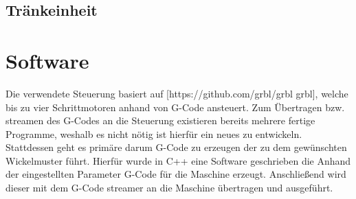 \documentclass[12pt, a4paper, ngerman]{article}
\begin{document}
\subsection{Tränkeinheit}



\section{Software}
Die verwendete Steuerung basiert auf [https://github.com/grbl/grbl grbl], welche bis zu vier Schrittmotoren anhand von G-Code ansteuert. Zum Übertragen bzw. streamen des G-Codes an die Steuerung existieren bereits mehrere fertige Programme, weshalb es nicht nötig ist hierfür ein neues zu entwickeln. Stattdessen geht es primäre darum G-Code zu erzeugen der zu dem gewünschten Wickelmuster führt. Hierfür wurde in C++ eine Software geschrieben die Anhand der eingestellten Parameter G-Code für die Maschine erzeugt. Anschließend wird dieser mit dem G-Code streamer an die Maschine übertragen und ausgeführt.
\end{document}
